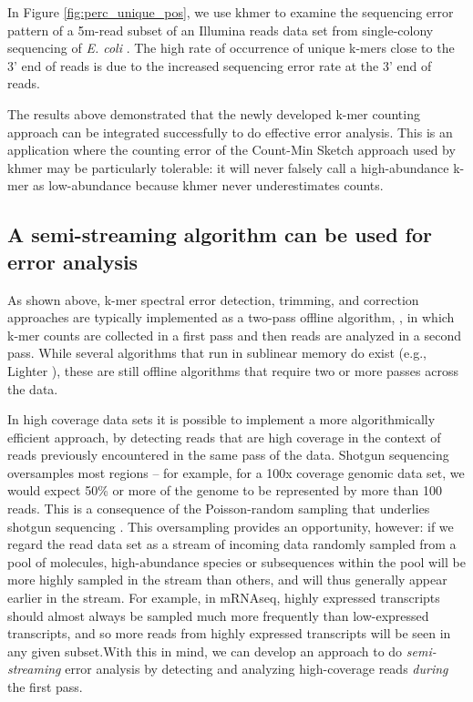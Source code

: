 In Figure \ref{fig:perc_unique_pos}, we use khmer to examine the sequencing
error pattern of a 5m-read subset of an Illumina reads data set from
single-colony sequencing of {\em E. coli} \cite{pubmed21926975}.  The high rate
of occurrence of unique k-mers close to the 3' end of reads is due to the
increased sequencing error rate at the 3' end of reads.


The results above demonstrated that the newly developed 
k-mer counting approach can be integrated successfully to do effective error 
analysis. This is an application where the counting error of the Count-Min Sketch approach
used by khmer may be particularly tolerable: it will never falsely
call a high-abundance k-mer as low-abundance because khmer never
underestimates counts.



\subsection{A semi-streaming algorithm can be used for error analysis}



As shown above, k-mer spectral error detection, trimming, and correction approaches
are typically implemented as a two-pass offline algorithm, , in which
k-mer counts are collected in a first pass and then reads are
analyzed in a second pass.  While several algorithms that run in
sublinear memory do exist (e.g., Lighter \cite{lighter}), these are
still offline algorithms that require two or more passes across
the data.



In high coverage data sets it is possible to implement a more
algorithmically efficient approach, by detecting reads that are high
coverage in the context of reads previously encountered in the same
pass of the data. 
Shotgun sequencing oversamples most regions -- for example, for a 100x
coverage genomic data set, we would expect 50\% or more of the genome
to be represented by more than 100 reads.  This is a consequence of
the Poisson-random sampling that underlies shotgun sequencing
\cite{waterman}.  This oversampling provides an opportunity, however:
if we regard the read data set as a stream of incoming data randomly
sampled from a pool of molecules, high-abundance species or
subsequences within the pool will be more highly sampled in the stream
than others, and will thus generally appear earlier in the stream.
For example, in mRNAseq, highly expressed transcripts should almost
always be sampled much more frequently than low-expressed transcripts,
and so more reads from highly expressed transcripts will be seen in
any given subset.With this in mind, we can develop an approach to do 
{\em semi-streaming} error analysis by detecting and
analyzing high-coverage reads {\em during} the first pass. 


